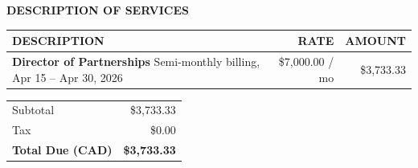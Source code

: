 \documentclass[11pt,a4paper]{article}
\renewcommand{\arraystretch}{1.25}
\newcommand{\eyebrowsimple}[1]{%
  \textcolor{faint}{\fontsize{8}{10}\selectfont\textbf{\MakeUppercase{#1}}}%
}
\begin{document}
\vspace{0.7cm}

\eyebrowsimple{Description of Services}
\vspace{6pt}

\renewcommand{\arraystretch}{1.5}
\begin{tabularx}{\textwidth}{@{} >{\RaggedRight}X r r @{}}
\hline
\rowcolor{soft}
{\fontsize{8}{10}\selectfont\textbf{\textcolor{muted}{\MakeUppercase{Description}}}} &
{\fontsize{8}{10}\selectfont\textbf{\textcolor{muted}{\MakeUppercase{Rate}}}} &
{\fontsize{8}{10}\selectfont\textbf{\textcolor{muted}{\MakeUppercase{Amount}}}} \\
\hline
\textcolor{ink}{\textbf{Director of Partnerships}}\newline
\textcolor{muted}{\footnotesize Semi-monthly billing, Apr 15 -- Apr 30, 2026}
& \textcolor{body}{\$7,000.00 / mo}
& \textcolor{ink}{\$3,733.33} \\
\hline
\end{tabularx}

\vspace{0.3cm}

\hfill
\begin{minipage}{0.45\textwidth}
\renewcommand{\arraystretch}{1.35}
\begin{tabularx}{\textwidth}{@{} X r @{}}
\textcolor{muted}{Subtotal} & \textcolor{body}{\$3,733.33} \\
\textcolor{muted}{Tax} & \textcolor{body}{\$0.00} \\
\hline
\rowcolor{soft}
\textcolor{ink}{\textbf{Total Due (CAD)}} &
{\fontsize{16}{18}\selectfont\textcolor{ink}{\textbf{\$3,733.33}}} \\
\hline
\end{tabularx}
\end{minipage}

\vspace{0.85cm}

\end{document}

